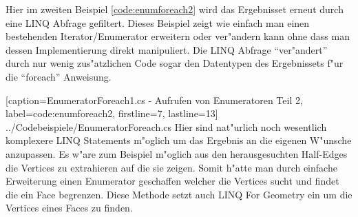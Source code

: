\documentclass[pagesize, paper=a4, fontsize=12pt,titlepage=true, headings=small, headnosepline, abstractoff, liststotoc, nochapterprefix, plainheadsepline]{scrreprt}
\newcommand{\LFGS}{LINQ For Geometry }
\begin{document}
Hier im zweiten Beispiel \ref{code:enumforeach2} wird das Ergebnisset erneut durch eine LINQ Abfrage gefiltert. Dieses Beispiel zeigt wie einfach man einen bestehenden Iterator/Enumerator erweitern oder ver"andern kann ohne dass man dessen Implementierung direkt manipuliert. Die LINQ Abfrage "`ver"andert"' durch nur wenig zus"atzlichen Code sogar den Datentypen des Ergebnissets f"ur die "`foreach"' Anweisung.

			[caption={EnumeratorForeach1.cs - Aufrufen von Enumeratoren Teil 2}, label=code:enumforeach2, firstline=7, lastline=13]
			{../Codebeispiele/EnumeratorForeach.cs}
Hier sind nat"urlich noch wesentlich komplexere LINQ Statements m"oglich um das Ergebnis an die eigenen W"unsche anzupassen. Es w"are zum Beispiel m"oglich aus den herausgesuchten Half-Edges die Vertices zu extrahieren auf die sie zeigen. Somit h"atte man durch einfache Erweiterung einen Enumerator geschaffen welcher die Vertices sucht und findet die ein Face begrenzen. Diese Methode setzt auch \LFGS ein um die Vertices eines Faces zu finden.
\newline
\end{document}
